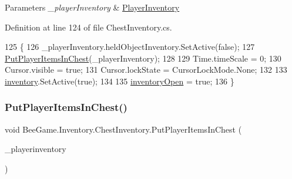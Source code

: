 \begin{DoxyParams}{Parameters}
{\em \+\_\+player\+Inventory} & \hyperlink{class_bee_game_1_1_inventory_1_1_player_inventory}{Player\+Inventory}\\
\hline
\end{DoxyParams}


Definition at line 124 of file Chest\+Inventory.\+cs.


\begin{DoxyCode}
125         \{
126             \_playerInventory.heldObjectInventory.SetActive(\textcolor{keyword}{false});
127             \hyperlink{class_bee_game_1_1_inventory_1_1_chest_inventory_ac08125dcf875928b702044b7a7b22a01}{PutPlayerItemsInChest}(\_playerInventory);
128 
129             Time.timeScale = 0;
130             Cursor.visible = \textcolor{keyword}{true};
131             Cursor.lockState = CursorLockMode.None;
132 
133             \hyperlink{class_bee_game_1_1_inventory_1_1_chest_inventory_ac6fe8eed65557a7eb99e56d201c55466}{inventory}.SetActive(\textcolor{keyword}{true});
134 
135             \hyperlink{class_bee_game_1_1_inventory_1_1_chest_inventory_a3e3529178934f2a4a8e91529c148457c}{inventoryOpen} = \textcolor{keyword}{true};
136         \}
\end{DoxyCode}
\mbox{\label{class_bee_game_1_1_inventory_1_1_chest_inventory_ac08125dcf875928b702044b7a7b22a01}} 
\subsubsection{\texorpdfstring{Put\+Player\+Items\+In\+Chest()}{PutPlayerItemsInChest()}}
{\footnotesize\ttfamily void Bee\+Game.\+Inventory.\+Chest\+Inventory.\+Put\+Player\+Items\+In\+Chest (\begin{DoxyParamCaption}\item[{\hyperlink{class_bee_game_1_1_inventory_1_1_player_inventory}{Player\+Inventory}}]{\+\_\+playerinventory }\end{DoxyParamCaption})\hspace{0.3cm}{\ttfamily [private]}}



